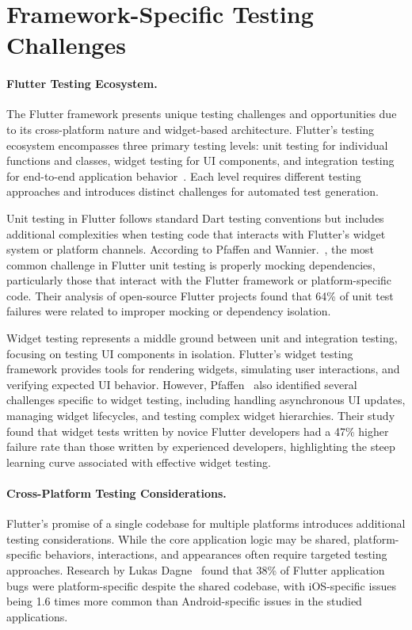 \section{Framework-Specific Testing Challenges}

\paragraph{Flutter Testing Ecosystem.} The Flutter framework presents unique testing challenges and opportunities due to its cross-platform nature and widget-based architecture. Flutter's testing ecosystem encompasses three primary testing levels: unit testing for individual functions and classes, widget testing for UI components, and integration testing for end-to-end application behavior~\cite{FlutterTesting}. Each level requires different testing approaches and introduces distinct challenges for automated test generation.

\hspace{0.5cm} Unit testing in Flutter follows standard Dart testing conventions but includes additional complexities when testing code that interacts with Flutter's widget system or platform channels. According to Pfaffen and Wannier.~\cite{FlutterTesting}, the most common challenge in Flutter unit testing is properly mocking dependencies, particularly those that interact with the Flutter framework or platform-specific code. Their analysis of open-source Flutter projects found that 64\% of unit test failures were related to improper mocking or dependency isolation.

\hspace{0.5cm} Widget testing represents a middle ground between unit and integration testing, focusing on testing UI components in isolation. Flutter's widget testing framework provides tools for rendering widgets, simulating user interactions, and verifying expected UI behavior. However, Pfaffen~\cite{FlutterTesting} also identified several challenges specific to widget testing, including handling asynchronous UI updates, managing widget lifecycles, and testing complex widget hierarchies. Their study found that widget tests written by novice Flutter developers had a 47\% higher failure rate than those written by experienced developers, highlighting the steep learning curve associated with effective widget testing.

\paragraph{Cross-Platform Testing Considerations.} Flutter's promise of a single codebase for multiple platforms introduces additional testing considerations. While the core application logic may be shared, platform-specific behaviors, interactions, and appearances often require targeted testing approaches. Research by Lukas Dagne~\cite{CrossPlatformTesting} found that 38\% of Flutter application bugs were platform-specific despite the shared codebase, with iOS-specific issues being 1.6 times more common than Android-specific issues in the studied applications.


